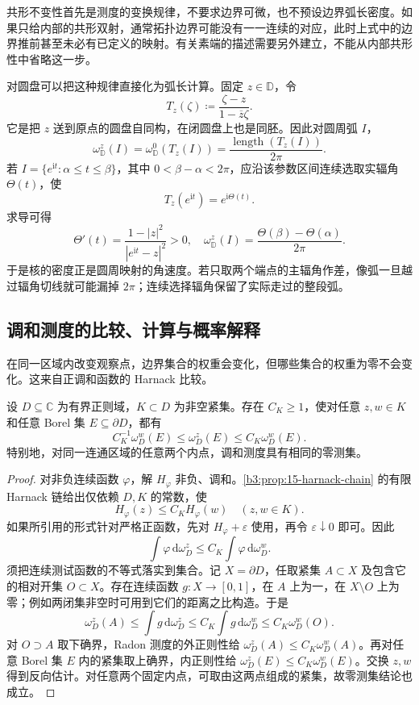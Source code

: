 共形不变性首先是测度的变换规律，不要求边界可微，也不预设边界弧长密度。如果只给内部的共形双射，通常拓扑边界可能没有一一连续的对应，此时上式中的边界推前甚至未必有已定义的映射。有关素端的描述需要另外建立，不能从内部共形性中省略这一步。

\ProseParagraphBreak
对圆盘可以把这种规律直接化为弧长计算。固定 \(z\in\mathbb D\)，令
\[
 T_z(\zeta)\coloneqq\frac{\zeta-z}{1-\overline z\zeta}.
\]
它是把 \(z\) 送到原点的圆盘自同构，在闭圆盘上也是同胚。因此对圆周弧 \(I\)，
\[
 \omega_{\mathbb D}^z(I)=\omega_{\mathbb D}^0(T_z(I))
 =\frac{\operatorname{length}(T_z(I))}{2\pi}.
\]
若 \(I=\{e^{\mathrm it}:\alpha\le t\le\beta\}\)，其中 \(0<\beta-\alpha<2\pi\)，应沿该参数区间连续选取实辐角 \(\Theta(t)\)，使
\[
 T_z(e^{\mathrm it})=e^{\mathrm i\Theta(t)}.
\]
求导可得
\[
 \Theta'(t)=\frac{1-|z|^2}{|e^{\mathrm it}-z|^2}>0,
 \quad
 \omega_{\mathbb D}^z(I)=\frac{\Theta(\beta)-\Theta(\alpha)}{2\pi}.
\]
于是核的密度正是圆周映射的角速度。若只取两个端点的主辐角作差，像弧一旦越过辐角切线就可能漏掉 \(2\pi\)；连续选择辐角保留了实际走过的整段弧。

\subsection{调和测度的比较、计算与概率解释}
\label{b3:subsec:160403}

在同一区域内改变观察点，边界集合的权重会变化，但哪些集合的权重为零不会变化。这来自正调和函数的 Harnack 比较。

\begin{proposition}[内部观察点的测度比较]\label{b3:prop:16-harmonic-measure-comparison}
设 \(D\subseteq\mathbb C\) 为有界正则域，\(K\subset D\) 为非空紧集。存在 \(C_K\ge1\)，使对任意 \(z,w\in K\) 和任意 Borel 集 \(E\subseteq\partial D\)，都有
\[
 C_K^{-1}\omega_D^w(E)\le\omega_D^z(E)
 \le C_K\omega_D^w(E).
\]
特别地，对同一连通区域的任意两个内点，调和测度具有相同的零测集。
\end{proposition}
\begin{proof}
对非负连续函数 \(\varphi\)，解 \(H_\varphi\) 非负、调和。\cref{b3:prop:15-harnack-chain} 的有限 Harnack 链给出仅依赖 \(D,K\) 的常数，使
\[
 H_\varphi(z)\le C_KH_\varphi(w)\quad(z,w\in K).
\]
如果所引用的形式针对严格正函数，先对 \(H_\varphi+\varepsilon\) 使用，再令 \(\varepsilon\downarrow0\) 即可。因此
\[
 \int\varphi\,\mathrm d\omega_D^z
 \le C_K\int\varphi\,\mathrm d\omega_D^w.
\]
须把连续测试函数的不等式落实到集合。记 \(X=\partial D\)，任取紧集 \(A\subset X\) 及包含它的相对开集 \(O\subset X\)。存在连续函数 \(g:X\to[0,1]\)，在 \(A\) 上为一，在 \(X\setminus O\) 上为零；例如两闭集非空时可用到它们的距离之比构造。于是
\[
 \omega_D^z(A)\le\int g\,\mathrm d\omega_D^z
 \le C_K\int g\,\mathrm d\omega_D^w
 \le C_K\omega_D^w(O).
\]
对 \(O\supset A\) 取下确界，Radon 测度的外正则性给
\(\omega_D^z(A)\le C_K\omega_D^w(A)\)。再对任意 Borel 集 \(E\) 内的紧集取上确界，内正则性给 \(\omega_D^z(E)\le C_K\omega_D^w(E)\)。交换 \(z,w\) 得到反向估计。对任意两个固定内点，可取由这两点组成的紧集，故零测集结论也成立。
\end{proof}

